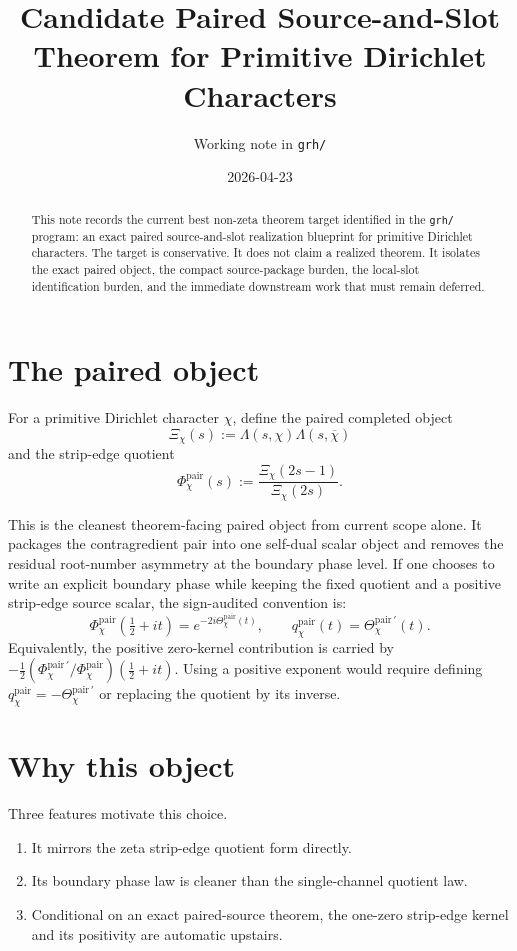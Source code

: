 \documentclass[11pt]{article}
\title{Candidate Paired Source-and-Slot Theorem for Primitive Dirichlet Characters}
\author{Working note in \texttt{grh/}}
\date{2026-04-23}
\begin{document}
\maketitle

\begin{abstract}
This note records the current best non-zeta theorem target identified in the
\texttt{grh/} program: an exact paired source-and-slot realization blueprint
for primitive Dirichlet characters. The target is conservative. It does not
claim a realized theorem. It isolates the exact paired object, the compact
source-package burden, the local-slot identification burden, and the immediate
downstream work that must remain deferred.
\end{abstract}

\section{The paired object}

For a primitive Dirichlet character \(\chi\), define the paired completed
object
\[
\Xi_\chi(s):=\Lambda(s,\chi)\Lambda(s,\overline\chi)
\]
and the strip-edge quotient
\[
\Phi_\chi^{\mathrm{pair}}(s):=\frac{\Xi_\chi(2s-1)}{\Xi_\chi(2s)}.
\]

This is the cleanest theorem-facing paired object from current scope alone. It
packages the contragredient pair into one self-dual scalar object and removes
the residual root-number asymmetry at the boundary phase level. If one chooses
to write an explicit boundary phase while keeping the fixed quotient and a
positive strip-edge source scalar, the sign-audited convention is:
\[
\Phi_\chi^{\mathrm{pair}}\!\left(\tfrac12+it\right)=e^{-2i\Theta_\chi^{\mathrm{pair}}(t)},
\qquad
q_\chi^{\mathrm{pair}}(t)=\Theta_\chi^{\mathrm{pair}\,\prime}(t).
\]
Equivalently, the positive zero-kernel contribution is carried by
\(-\frac12(\Phi_\chi^{\mathrm{pair}\,\prime}/
\Phi_\chi^{\mathrm{pair}})(\tfrac12+it)\). Using a positive exponent would
require defining \(q_\chi^{\mathrm{pair}}=-\Theta_\chi^{\mathrm{pair}\,\prime}\)
or replacing the quotient by its inverse.

\section{Why this object}

Three features motivate this choice.

\begin{enumerate}
\item It mirrors the zeta strip-edge quotient form directly.
\item Its boundary phase law is cleaner than the single-channel quotient law.
\item Conditional on an exact paired-source theorem, the one-zero strip-edge
kernel and its positivity are automatic upstairs.
\end{enumerate}
\end{document}
